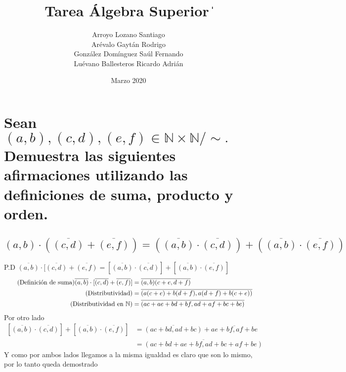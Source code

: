 \documentclass[12pt]{article}
\title{Tarea Álgebra Superior \|}
\author{Arroyo Lozano Santiago \\ Arévalo Gaytán Rodrigo \\  González Domínguez Saúl Fernando \\ Luévano Ballesteros Ricardo Adrián}
\date{Marzo 2020}
\begin{document}
	\maketitle

	\section{Sean \( (a,b),(c,d),(e, f) \in \mathbb{N} \times \mathbb{N}/\sim. \) Demuestra las siguientes afirmaciones utilizando las definiciones de suma, producto y orden.}
	    \subsection{$(a, b) \cdot(\overline{(c, d)}+\overline{(e, f)})=(\overline{(a, b)} \cdot \overline{(c, d)})+(\overline{(a, b)} \cdot \overline{(e, f)})$}
	        P.D $\overline{(a,b)} \cdot [ \overline{(c,d)} + \overline{(e,f)} = [\overline{(a,b)} \cdot \overline{(c,d)} ] + [\overline{(a,b)} \cdot \overline{(e,f)} ]$
	        \begin{align}
	             \tag{Definición de suma} \overline{(a,b)} \cdot [ \overline{(c,d)} + \overline{(e,f)}] &= \overline{(a,b)} \overline{(c+e,d+f)} \\
	             \tag{Distributividad} &=\overline{(a(c+e)+b(d+f),a(d+f)+b(c+e))} \\
	             \tag{Distributividad en $\mathbb{N}$} &= \overline{(ac+ae+bd+bf,ad+af+bc+be)}
	        \end{align}
	        Por otro lado
	        \begin{align}
	            \tag{Por definición de producto} [\overline{(a,b)} \cdot \overline{(c,d)} ] + [\overline{(a,b)} \cdot \overline{(e,f)} ] &= \overline{(ac+bd,ad+bc)} + \overline{ae+bf,af+be}  \\
	             \tag{Por definición de suma} &= \overline{(ac+bd+ae+bf,ad+bc+af+be)}
	        \end{align}
	        Y como por ambos lados llegamos a la misma igualdad es claro que son lo mismo, por lo tanto queda demostrado \quad \blacksquare
\end{document}
